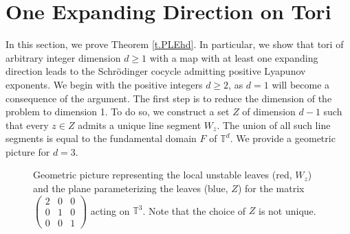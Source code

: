 \documentclass{amsart}
\newcommand{\TT}{\mathbb{T}}
\begin{document}
\section{One Expanding Direction on Tori}\hypertarget{OEDT}{}

In this section, we prove Theorem \ref{t.PLEhd}. In particular, we show that tori of arbitrary integer dimension $d\geq 1$ with a map with at least one expanding direction leads to the Schr\"odinger cocycle admitting positive Lyapunov exponents. We begin with the positive integers $d\geq 2$, as $d=1$ will become a consequence of the argument. The first step is to reduce the dimension of the problem to dimension 1. To do so, we construct a set $Z$ of dimension $d-1$ such that every $z\in Z$ admits a unique line segment $W_z$. The union of all such line segments is equal to the fundamental domain $F$ of $\TT^d$. We provide a geometric picture for $d = 3$.

\begin{figure}[H]
    \centering
        
    \caption{Geometric picture representing the local unstable leaves (red, $W_z$) and the plane parameterizing the leaves (blue, $Z$) for the matrix $\begin{pmatrix}
        2 & 0 & 0\\
        0 & 1 & 0\\
        0 & 0 & 1
    \end{pmatrix}$ acting on $\TT^3$. Note that the choice of $Z$ is not unique.}
\end{figure}
\end{document}
